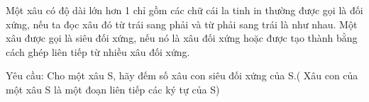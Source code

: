 Một xâu có độ dài lớn hơn 1 chỉ gồm các chữ cái la tinh in thường được gọi là đối xứng, nếu ta đọc xâu đó từ trái sang phải và từ phải sang trái là như nhau. Một xâu được gọi là siêu đối xứng, nếu nó là xâu đối xứng hoặc được tạo thành bằng cách ghép liên tiếp từ nhiều xâu đối xứng.  

   Yêu cầu: Cho một xâu S, hãy đếm số xâu con siêu đối xứng của S.( Xâu con của một xâu S là một đoạn liên tiếp các ký tự của S)  

\